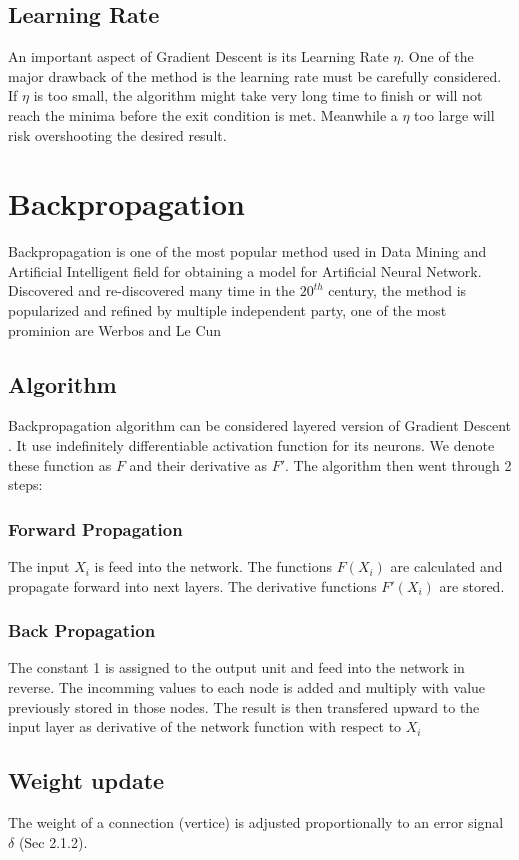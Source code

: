 \documentclass{article}
\begin{document}
\subsection{Learning Rate}
An important aspect of Gradient Descent is its Learning Rate $\eta$. One of the major drawback of the method is the learning rate must be carefully considered. If $\eta$ is too small, the algorithm might take very long time to finish or will not reach the minima before the exit condition is met. Meanwhile a $\eta$ too large will risk overshooting the desired result.

\section{Backpropagation}
Backpropagation is one of the most popular method used in Data Mining and Artificial Intelligent field for obtaining a model for Artificial Neural Network. Discovered and re-discovered many time in the $20^{th}$ century, the method is popularized and refined by multiple independent party, one of the most prominion are Werbos and Le Cun \cite{lecun_theoretical_1992}
\subsection{Algorithm}
Backpropagation algorithm can be considered layered version of Gradient Descent \cite{bishop_pattern_2006}. It use indefinitely differentiable activation function for its neurons. We denote these function as $F$ and their derivative as $F'$. The algorithm then went through 2 steps: \cite[161]{rojas_neural_1996}
\subsubsection{Forward Propagation}
The input $X_i$ is feed into the network. The functions $F(X_i)$ are calculated and propagate forward into next layers. The derivative functions $F'(X_i)$ are stored.
\subsubsection{Back Propagation}
The constant 1 is assigned to the output unit and feed into the network in reverse. The incomming values to each node is added and multiply with value previously stored in those nodes. The result is then transfered upward to the input layer as derivative of the network function with respect to $X_i$
\subsection{Weight update}
The weight of a connection (vertice) is adjusted proportionally to an error signal $\delta$ (Sec 2.1.2). 
\end{document}

